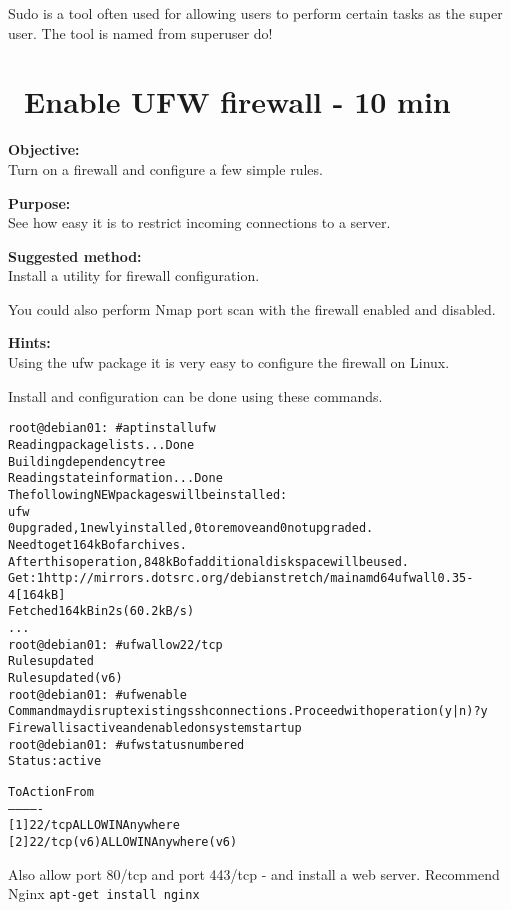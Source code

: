 \documentclass[a4paper,11pt,notitlepage]{report}
\begin{document}
Sudo is a tool often used for allowing users to perform certain tasks as the super user. The tool is named from superuser do! 


\chapter{\faExclamationTriangle\ Enable UFW firewall - 10 min}
\label{ex:debian-firewall}

{\bf Objective:}\\
Turn on a firewall and configure a few simple rules.

{\bf Purpose:}\\
See how easy it is to restrict incoming connections to a server.


{\bf Suggested method:}\\
Install a utility for firewall configuration.

You could also perform Nmap port scan with the firewall enabled and disabled.

{\bf Hints:}\\
Using the ufw package it is very easy to configure the firewall on Linux.

Install and configuration can be done using these commands.
\begin{alltt}
root@debian01:~# apt install ufw
Reading package lists... Done
Building dependency tree
Reading state information... Done
The following NEW packages will be installed:
  ufw
0 upgraded, 1 newly installed, 0 to remove and 0 not upgraded.
Need to get 164 kB of archives.
After this operation, 848 kB of additional disk space will be used.
Get:1 http://mirrors.dotsrc.org/debian stretch/main amd64 ufw all 0.35-4 [164 kB]
Fetched 164 kB in 2s (60.2 kB/s)
...
root@debian01:~# ufw allow 22/tcp
Rules updated
Rules updated (v6)
root@debian01:~# ufw enable
Command may disrupt existing ssh connections. Proceed with operation (y|n)? y
Firewall is active and enabled on system startup
root@debian01:~# ufw status numbered
Status: active

     To                         Action      From
     --                         ------      ----
[ 1] 22/tcp                     ALLOW IN    Anywhere
[ 2] 22/tcp (v6)                ALLOW IN    Anywhere (v6)
\end{alltt}

Also allow port 80/tcp and port 443/tcp - and install a web server. Recommend Nginx \verb+apt-get install nginx+
\end{document}
